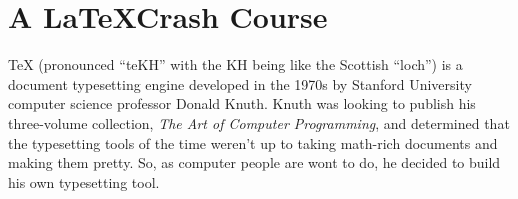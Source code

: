 %
%
%
%
%
%
%
%
%
%

\chapter{A \LaTeX Crash Course} \label{chap:crashcourse}

\TeX{} (pronounced ``teKH'' with the KH being like the Scottish ``loch'') is a
document typesetting engine developed in the 1970s by Stanford University
computer science professor Donald Knuth. Knuth was looking to publish his
three-volume collection, \emph{The Art of Computer Programming}, and
determined that the typesetting tools of the time weren't up to taking
math-rich documents and making them pretty. So, as computer people are wont to
do, he decided to build his own typesetting tool.

